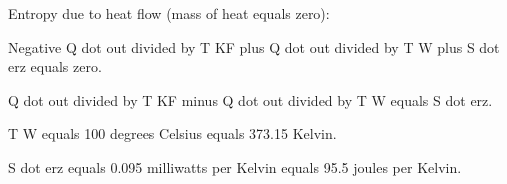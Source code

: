 Entropy due to heat flow (mass of heat equals zero):  

Negative Q dot out divided by T KF plus Q dot out divided by T W plus S dot erz equals zero.  

Q dot out divided by T KF minus Q dot out divided by T W equals S dot erz.  

T W equals 100 degrees Celsius equals 373.15 Kelvin.  

S dot erz equals 0.095 milliwatts per Kelvin equals 95.5 joules per Kelvin.
